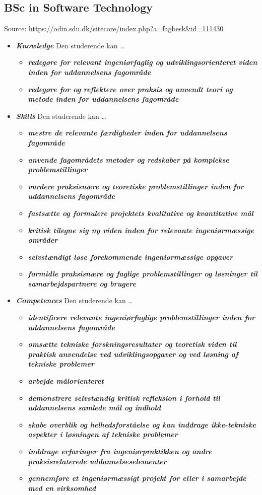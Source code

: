 \documentclass[a4paper, oneside]{memoir}
\newcommand{\textdesc}[1]{\textit{\textbf{#1}}}
\newcommand{\descitem}[1]{\item \textdesc{#1}}
\begin{document}
\subsection{BSc in Software Technology}
Source: \url{https://odin.sdu.dk/sitecore/index.php?a=fagbesk&id=111430}
\begin{itemize}
  \descitem{Knowledge} Den studerende kan \ldots
    \begin{itemize}
      \descitem{redegøre for relevant ingeniørfaglig og udviklingsorienteret viden inden for uddannelsens fagområde}
      \descitem{redegøre for og reflektere over praksis og anvendt teori og metode inden for uddannelsens fagområde}
    \end{itemize}
  \descitem{Skills} Den studerende kan \ldots
    \begin{itemize}
      \descitem{mestre de relevante færdigheder inden for uddannelsens fagområde}
      \descitem{anvende fagområdets metoder og redskaber på komplekse problemstillinger}
      \descitem{vurdere praksisnære og teoretiske problemstillinger inden for uddannelsens fagområde}
      \descitem{fastsætte og formulere projektets kvalitative og kvantitative mål}
      \descitem{kritisk tilegne sig ny viden inden for relevante ingeniørmæssige områder}
      \descitem{selvstændigt løse forekommende ingeniørmæssige opgaver}
      \descitem{formidle praksisnære og faglige problemstillinger og løsninger til samarbejdspartnere og brugere}
    \end{itemize}
  \descitem{Competences} Den studerende kan \ldots
    \begin{itemize}
      \descitem{identificere relevante ingeniørfaglige problemstillinger inden for uddannelsens fagområde}
      \descitem{omsætte tekniske forskningsresultater og teoretisk viden til praktisk anvendelse ved udviklingsopgaver og ved løsning af tekniske problemer}
      \descitem{arbejde målorienteret}
      \descitem{demonstrere selvstændig kritisk refleksion i forhold til uddannelsens samlede mål og indhold}
      \descitem{skabe overblik og helhedsforståelse og kan inddrage ikke-tekniske aspekter i løsningen af tekniske problemer}
      \descitem{inddrage erfaringer fra ingeniørpraktikken og andre praksisrelaterede uddannelseselementer}
      \descitem{gennemføre et ingeniørmæssigt projekt for eller i samarbejde med en virksomhed}
    \end{itemize}
\end{itemize}

\end{document}
